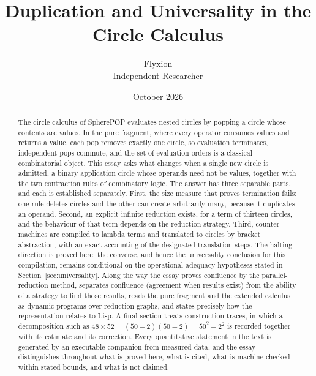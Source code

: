 \documentclass[11pt,a4paper]{article}
\title{Duplication and Universality in the Circle Calculus}
\author{Flyxion\\\small Independent Researcher}
\date{October 2026}
\theoremstyle{plain}
\theoremstyle{definition}
\theoremstyle{remark}
\begin{document}
\maketitle

\begin{abstract}
\noindent
The circle calculus of SpherePOP evaluates nested circles by popping a circle whose contents are values. In the pure fragment, where every operator consumes values and returns a value, each pop removes exactly one circle, so evaluation terminates, independent pops commute, and the set of evaluation orders is a classical combinatorial object. This essay asks what changes when a single new circle is admitted, a binary application circle whose operands need not be values, together with the two contraction rules of combinatory logic. The answer has three separable parts, and each is established separately. First, the size measure that proves termination fails: one rule deletes circles and the other can create arbitrarily many, because it duplicates an operand. Second, an explicit infinite reduction exists, for a term of thirteen circles, and the behaviour of that term depends on the reduction strategy. Third, counter machines are compiled to lambda terms and translated to circles by bracket abstraction, with an exact accounting of the designated translation steps. The halting direction is proved here; the converse, and hence the universality conclusion for this compilation, remains conditional on the operational adequacy hypotheses stated in Section~\ref{sec:universality}. Along the way the essay proves confluence by the parallel-reduction method, separates confluence (agreement when results exist) from the ability of a strategy to find those results, reads the pure fragment and the extended calculus as dynamic programs over reduction graphs, and states precisely how the representation relates to Lisp. A final section treats construction traces, in which a decomposition such as $48\times 52=(50-2)(50+2)=50^2-2^2$ is recorded together with its estimate and its correction. Every quantitative statement in the text is generated by an executable companion from measured data, and the essay distinguishes throughout what is proved here, what is cited, what is machine-checked within stated bounds, and what is not claimed.
\end{abstract}

\tableofcontents















\end{document}
